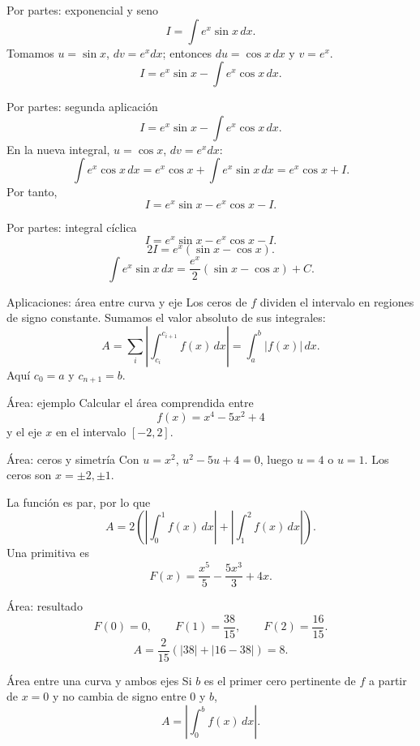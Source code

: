 \documentclass[original_version/main.tex]{subfiles}
\begin{document}
\begin{frame}{Por partes: exponencial y seno}
\[I=\int e^x\sin x\,dx.\]Tomamos $u=\sin x$, $dv=e^x dx$; entonces $du=\cos x\,dx$ y $v=e^x$.\[I=e^x\sin x-\int e^x\cos x\,dx.\]
\end{frame}

\begin{frame}{Por partes: segunda aplicación}
\[I=e^x\sin x-\int e^x\cos x\,dx.\]En la nueva integral, $u=\cos x$, $dv=e^x dx$:\[\int e^x\cos x\,dx=e^x\cos x+\int e^x\sin x\,dx=e^x\cos x+I.\]Por tanto,\[I=e^x\sin x-e^x\cos x-I.\]
\end{frame}

\begin{frame}{Por partes: integral cíclica}
\[I=e^x\sin x-e^x\cos x-I.\]\[2I=e^x(\sin x-\cos x).\]\[\boxed{\int e^x\sin x\,dx=\frac{e^x}{2}(\sin x-\cos x)+C.}\]
\end{frame}

\begin{frame}{Aplicaciones: área entre curva y eje}
Los ceros de $f$ dividen el intervalo en regiones de signo constante. Sumamos el valor absoluto de sus integrales:\[A=\sum_i\left|\int_{c_i}^{c_{i+1}}f(x)\,dx\right|=\int_a^b|f(x)|\,dx.\]Aquí $c_0=a$ y $c_{n+1}=b$.
\end{frame}

\begin{frame}{Área: ejemplo}
Calcular el área comprendida entre\[f(x)=x^4-5x^2+4\]y el eje $x$ en el intervalo $[-2,2]$.
\end{frame}

\begin{frame}{Área: ceros y simetría}
\small Con $u=x^2$, $u^2-5u+4=0$, luego $u=4$ o $u=1$. Los ceros son $x=\pm2,\pm1$.\par\medskip La función es par, por lo que\[A=2\left(\left|\int_0^1f(x)\,dx\right|+\left|\int_1^2f(x)\,dx\right|\right).\]Una primitiva es\[F(x)=\frac{x^5}{5}-\frac{5x^3}{3}+4x.\]
\end{frame}

\begin{frame}{Área: resultado}
\[F(0)=0,\qquad F(1)=\frac{38}{15},\qquad F(2)=\frac{16}{15}.\]\[A=\frac2{15}(|38|+|16-38|)=\boxed{8}.\]
\end{frame}

\begin{frame}{Área entre una curva y ambos ejes}
Si $b$ es el primer cero pertinente de $f$ a partir de $x=0$ y no cambia de signo entre $0$ y $b$,\[A=\left|\int_0^b f(x)\,dx\right|.\]
\end{frame}
\end{document}
